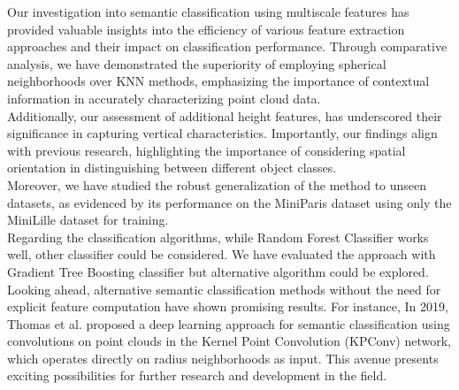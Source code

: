 \documentclass{article}
\begin{document}
Our investigation into semantic classification using multiscale features has provided valuable insights into the efficiency of various feature extraction approaches and their impact on classification performance. 
Through comparative analysis, we have demonstrated the superiority of employing spherical neighborhoods over KNN methods, emphasizing the importance of contextual information in accurately characterizing point cloud data. \\ 
Additionally, our assessment of additional height features, has underscored their significance in capturing vertical characteristics. Importantly, our findings align with previous research, highlighting the importance of considering spatial orientation in distinguishing between different object classes. \\ 
Moreover, we have studied the robust generalization of the method to unseen datasets, as evidenced by its performance on the MiniParis dataset using only the MiniLille dataset for training. \\ 
Regarding the classification algorithms, while Random Forest Classifier works well, other classifier could be considered. We have evaluated the approach with Gradient Tree Boosting classifier but alternative algorithm could be explored. \\ 
Looking ahead, alternative semantic classification methods without the need for explicit feature computation have shown promising results. For instance, In 2019, Thomas et al. \cite{thomas_kpconv_2019} proposed a deep learning approach for semantic classification using convolutions on point clouds in the Kernel Point Convolution (KPConv) network, which operates directly on radius neighborhoods as input. This avenue presents exciting possibilities for further research and development in the field.



\end{document}
